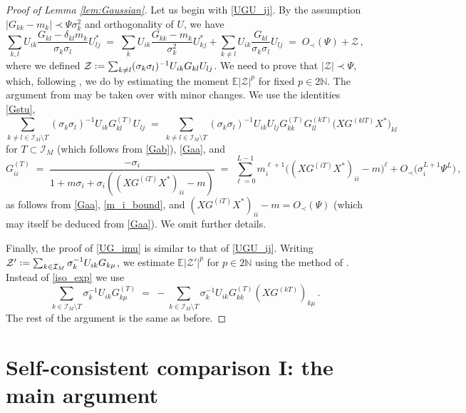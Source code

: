 \documentclass[11pt]{article} %
\numberwithin{equation}{section}
\numberwithin{figure}{section}
\theoremstyle{plain} %
\theoremstyle{definition} %
\renewcommand{\cal}{\mathcal}
\newcommand{\E}{\mathbb{E}}
\newcommand{\N}{\mathbb{N}}
\newcommand*{\deq}{\mathrel{\vcenter{\baselineskip0.65ex \lineskiplimit0pt \hbox{.}\hbox{.}}}=}
\newcommand{\pb}[1]{\bigl({#1}\bigr)}
\newcommand{\abs}[1]{\lvert #1 \rvert}
\begin{document}
\begin{proof}[Proof of Lemma \ref{lem:Gaussian}]
Let us begin with \eqref{UGU_ij}. By the assumption $\abs{G_{kk} - m_k} \prec \Psi \sigma_k^2$ and orthogonality of $U$, we have
\begin{equation*}
\sum_{k,l} U_{ik} \frac{G_{kl} - \delta_{kl} m_k}{\sigma_k \sigma_l} U^*_{lj} \;=\; \sum_{k} U_{ik} \frac{G_{kk} - m_k}{\sigma_k^2} U^*_{kj} + \sum_{k \neq l} U_{ik} \frac{G_{kl}}{\sigma_k \sigma_l} U_{lj} \;=\; O_\prec(\Psi) + \cal Z\,,
\end{equation*}
where we defined $\cal Z \deq \sum_{k \neq l} (\sigma_k \sigma_l)^{-1} U_{ik} G_{kl} U_{lj}$. We need to prove that $\abs{\cal Z} \prec \Psi$, which, following \cite[Section 5]{BEKYY}, we do by estimating the moment $\E \abs{\cal Z}^p$ for fixed $p \in 2 \N$. The argument from \cite[Section 5]{BEKYY} may be taken over with minor changes. We use the identities \eqref{Gstu},
\begin{equation} \label{iso_exp}
\sum_{k \neq l \in \cal I_M \setminus T} (\sigma_k \sigma_l)^{-1} U_{ik} G_{kl}^{(T)} U_{lj} \;=\;  \sum_{k \neq l \in \cal I_M \setminus T} (\sigma_k \sigma_l)^{-1} U_{ik} U_{lj} G_{kk}^{(T)} G_{ll}^{(kT)} \pb{X G^{(klT)} X^*}_{kl}
\end{equation}
for $T \subset \cal I_M$ (which follows from \eqref{Gab}), \eqref{Gaa}, and
\begin{equation*}
G_{ii}^{(T)} \;=\; \frac{-\sigma_i}{1 + m \sigma_i + \sigma_i ((X G^{(i T)} X^*)_{ii} - m)} \;=\; \sum_{\ell = 0}^{L - 1} m_i^{\ell + 1} \pb{(X G^{(i T)} X^*)_{ii} - m}^\ell + O_\prec \pb{\sigma_i^{L + 1} \Psi^L}\,,
\end{equation*}
as follows from \eqref{Gaa}, \eqref{m_i_bound}, and $(X G^{(i T)} X^*)_{ii} - m = O_\prec(\Psi)$ (which may itself be deduced from \eqref{Gaa}). We omit further details.

Finally, the proof of \eqref{UG_imu} is similar to that of \eqref{UGU_ij}. Writing $\cal Z' \deq \sum_{k \in \cal I_M} \sigma_k^{-1} U_{ik} G_{k \mu}$, we estimate $\E \abs{\cal Z'}^p$ for $p \in 2\N$ using the method of \cite[Section 5]{BEKYY}. Instead of \eqref{iso_exp} we use
\begin{equation*}
\sum_{k \in \cal I_M \setminus T} \sigma_k^{-1} U_{ik} G_{k \mu}^{(T)} \;=\; - \sum_{k \in \cal I_M \setminus T} \sigma_k^{-1} U_{ik} G_{kk}^{(T)} (X G^{(kT)})_{k \mu}\,.
\end{equation*}
The rest of the argument is the same as before.
\end{proof}

\section{Self-consistent comparison I: the main argument} \label{sec:comparison1}
\end{document}
